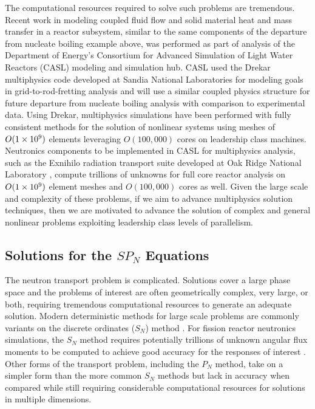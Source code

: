 The computational resources required to solve such problems are
tremendous. Recent work in modeling coupled fluid flow and solid
material heat and mass transfer in a reactor subsystem, similar to the
same components of the departure from nucleate boiling example above,
was performed as part of analysis of the Department of Energy's
Consortium for Advanced Simulation of Light Water Reactors (CASL)
modeling and simulation hub. CASL used the Drekar multiphysics code
developed at Sandia National Laboratories
\citep{pawlowski_drekar_2012} for modeling goals in
grid-to-rod-fretting analysis and will use a similar coupled physics
structure for future departure from nucleate boiling analysis with
comparison to experimental data. Using Drekar, multiphysics
simulations have been performed with fully consistent methods for the
solution of nonlinear systems using meshes of $O(1\times 10^{9})$ elements
leveraging $O(100,000)$ cores on leadership class machines. Neutronics
components to be implemented in CASL for multiphysics analysis, such
as the Exnihilo radiation transport suite developed at Oak Ridge
National Laboratory \citep{evans_denovo:_2010}, compute trillions of
unknowns for full core reactor analysis on $O(1\times 10^{9})$ element
meshes and $O(100,000)$ cores as well. Given the large scale and
complexity of these problems, if we aim to advance multiphysics
solution techniques, then we are motivated to advance the solution of
complex and general nonlinear problems exploiting leadership class
levels of parallelism.

\subsection{Solutions for the $SP_N$ Equations}
\label{subsec:spn_motiviation}
The neutron transport problem is complicated. Solutions cover a large
phase space and the problems of interest are often geometrically
complex, very large, or both, requiring tremendous computational
resources to generate an adequate solution. Modern deterministic
methods for large scale problems are commonly variants on the discrete
ordinates ($S_N$) method \citep{evans_denovo:_2010}. For fission
reactor neutronics simulations, the $S_N$ method requires potentially
trillions of unknown angular flux moments to be computed to achieve
good accuracy for the responses of interest
\citep{slaybaugh_acceleration_2011}. Other forms of the transport
problem, including the $P_N$ method, take on a simpler form than the
more common $S_N$ methods but lack in accuracy when compared while
still requiring considerable computational resources for solutions in
multiple dimensions.

